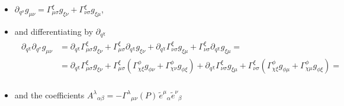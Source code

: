 \documentclass[letterpaper,10pt,english]{jupyterBook}
\begin{document}
\begin{itemize}
\item {} 
\sphinxAtStartPar
\(\partial_{q^\sigma} g_{\mu \nu} = \Gamma^{\xi}_{\mu \sigma} g_{\xi \nu} + \Gamma^{\xi}_{\nu \sigma} g_{\xi \mu}\),

\item {} 
\sphinxAtStartPar
and differentiating by \(\partial_{q^\chi}\)
\begin{equation*}
\begin{split}\begin{aligned}
        \partial_{q^\chi} \partial_{q^\sigma} g_{\mu \nu}
        & = \partial_{q^\chi} \Gamma^{\xi}_{\mu \sigma} g_{\xi \nu} + \Gamma^{\xi}_{\mu \sigma} \partial_{q^\chi} g_{\xi \nu} + \partial_{q^\chi} \Gamma^{\xi}_{\nu \sigma} g_{\xi \mu} + \Gamma^{\xi}_{\nu \sigma} \partial_{q^\chi} g_{\xi \mu} = \\
        & = \partial_{q^\chi} \Gamma^{\xi}_{\mu \sigma} g_{\xi \nu} + \Gamma^{\xi}_{\mu \sigma} \left( \Gamma^{\phi}_{\chi\xi} g_{\phi \nu} + \Gamma^{\phi}_{\chi\nu} g_{\phi \xi} \right) + \partial_{q^\chi} \Gamma^{\xi}_{\nu \sigma} g_{\xi \mu} + \Gamma^{\xi}_{\nu \sigma} \left( \Gamma^{\phi}_{\chi\xi} g_{\phi \mu} + \Gamma^{\phi}_{\chi\mu} g_{\phi \xi} \right) = \\
   \end{aligned}\end{split}
\end{equation*}
\item {} 
\sphinxAtStartPar
and the coefficients \(A^\lambda{}_{\alpha\beta}=-\Gamma^\lambda{}_{\mu\nu}(P)\,\tilde e^\mu{}_\alpha\tilde e^\nu{}_\beta\)

\end{itemize}
\end{document}
